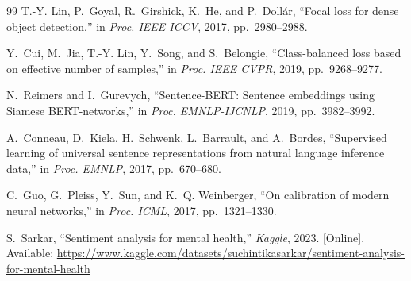 \documentclass[conference, 10pt]{IEEEtran}
\begin{document}
\begin{thebibliography}{99}
T.-Y. Lin, P.~Goyal, R.~Girshick, K.~He, and P.~Doll\'{a}r, ``Focal loss for dense object detection,'' in \textit{Proc. IEEE ICCV}, 2017, pp.~2980--2988.

Y.~Cui, M.~Jia, T.-Y. Lin, Y.~Song, and S.~Belongie, ``Class-balanced loss based on effective number of samples,'' in \textit{Proc. IEEE CVPR}, 2019, pp.~9268--9277.

N.~Reimers and I.~Gurevych, ``Sentence-BERT: Sentence embeddings using Siamese BERT-networks,'' in \textit{Proc. EMNLP-IJCNLP}, 2019, pp.~3982--3992.

A.~Conneau, D.~Kiela, H.~Schwenk, L.~Barrault, and A.~Bordes, ``Supervised learning of universal sentence representations from natural language inference data,'' in \textit{Proc. EMNLP}, 2017, pp.~670--680.

C.~Guo, G.~Pleiss, Y.~Sun, and K.~Q. Weinberger, ``On calibration of modern neural networks,'' in \textit{Proc. ICML}, 2017, pp.~1321--1330.

S.~Sarkar, ``Sentiment analysis for mental health,'' \textit{Kaggle}, 2023. [Online]. Available: \url{https://www.kaggle.com/datasets/suchintikasarkar/sentiment-analysis-for-mental-health}

\end{thebibliography}
\end{document}
